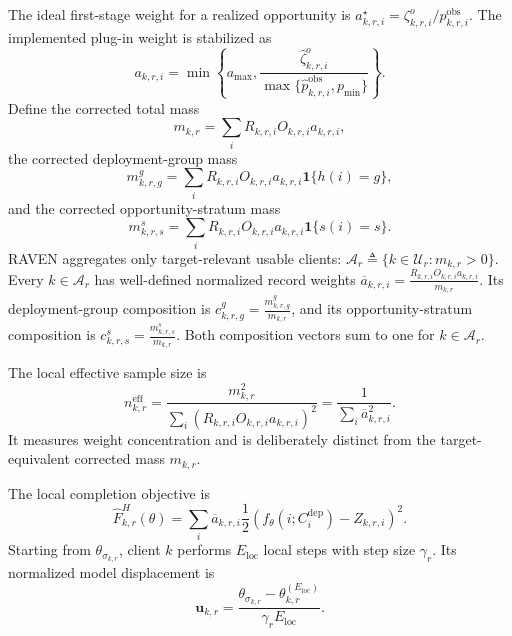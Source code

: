 \documentclass[letterpaper,journal]{IEEEtran}
\begin{document}
The ideal first-stage weight for a realized opportunity is
$a^\star_{k,r,i}=\zeta^{o}_{k,r,i}/p^{\mathrm{obs}}_{k,r,i}$.
The implemented plug-in weight is stabilized as
\begin{equation}
 a_{k,r,i}
 =
 \min\!\left\{
 a_{\max},
 \frac{\widehat\zeta^{o}_{k,r,i}}
 {\max\{\widehat p^{\mathrm{obs}}_{k,r,i},p_{\min}\}}
 \right\}.
 \label{eq:a_stabilized}
\end{equation}
Define the corrected total mass
\begin{equation}
    m_{k,r}
    =
    \sum_i
    R_{k,r,i}O_{k,r,i}a_{k,r,i},
    \label{eq:m_total}
\end{equation}
the corrected deployment-group mass
\begin{equation}
 m^{g}_{k,r,g}
 =
 \sum_i
 R_{k,r,i}O_{k,r,i}a_{k,r,i}
 \mathbf{1}\{h(i)=g\},
 \label{eq:m_group}
\end{equation}
and the corrected opportunity-stratum mass
\begin{equation}
 m^{s}_{k,r,s}
 =
 \sum_i
 R_{k,r,i}O_{k,r,i}a_{k,r,i}
 \mathbf{1}\{s(i)=s\}.
 \label{eq:m_stratum}
\end{equation}
RAVEN aggregates only target-relevant usable clients:
$\mathcal{A}_r\triangleq\{k\in\mathcal{U}_r:m_{k,r}>0\}$.
Every $k\in\mathcal{A}_r$ has well-defined normalized record weights
$\overline a_{k,r,i}=\frac{R_{k,r,i}O_{k,r,i}a_{k,r,i}}{m_{k,r}}$.
Its deployment-group composition is
$c^{g}_{k,r,g}=\frac{m^{g}_{k,r,g}}{m_{k,r}}$, and its
opportunity-stratum composition is
$c^{s}_{k,r,s}=\frac{m^{s}_{k,r,s}}{m_{k,r}}$.
Both composition vectors sum to one for $k\in\mathcal{A}_r$.

The local effective sample size is
\begin{equation}
 n^{\mathrm{eff}}_{k,r}
 =
 \frac{m_{k,r}^2}
 {\sum_i
  (R_{k,r,i}O_{k,r,i}a_{k,r,i})^2}
 =
 \frac{1}{\sum_i\overline a_{k,r,i}^2}.
 \label{eq:neff}
\end{equation}
It measures weight concentration and is deliberately distinct from the
target-equivalent corrected mass $m_{k,r}$.

The local completion objective is
\begin{equation}
 \widehat F^{H}_{k,r}(\theta)
 =
 \sum_i
 \overline a_{k,r,i}
 \frac{1}{2}
 \left(
 f_{\theta}(i;C_i^{\mathrm{dep}})
 -
 Z_{k,r,i}
 \right)^2.
 \label{eq:local_hajek_objective}
\end{equation}
Starting from $\theta_{\sigma_{k,r}}$, client $k$ performs
$E_{\mathrm{loc}}$ local steps with step size $\gamma_r$.  Its normalized model
displacement is
\begin{equation}
 \mathbf{u}_{k,r}
 =
 \frac{
 \theta_{\sigma_{k,r}}
 -
 \theta^{(E_{\mathrm{loc}})}_{k,r}
 }{\gamma_r E_{\mathrm{loc}}}.
 \label{eq:normalized_update}
\end{equation}
\end{document}
